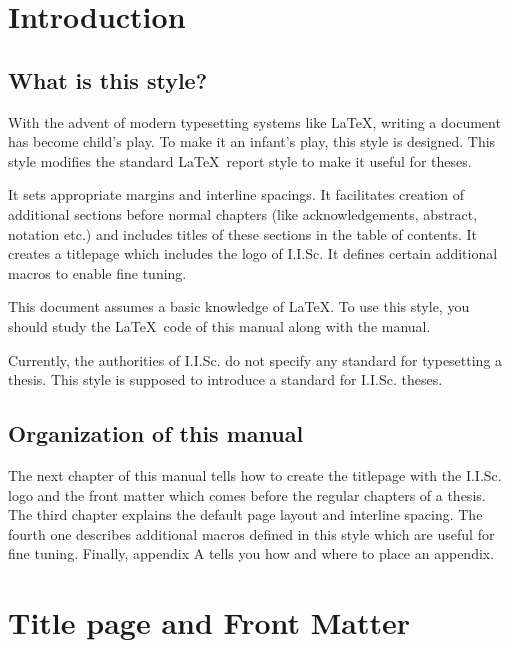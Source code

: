 \chapter{Introduction}

\section{What is this style?}
	With the  advent of modern typesetting  systems   like \LaTeX \cite{latex},
writing a document has  become child's  play.  To make it  an infant's
play,   this  style  is  designed.  This  style  modifies the standard
\LaTeX\ report style to make it useful for theses.

    It sets appropriate margins and interline spacings.  It facilitates
creation  of    additional  sections    before  normal  chapters  (like
acknowledgements, abstract, notation   etc.)   and includes titles  of
these sections in the table of contents. It  creates a titlepage which
includes  the  logo of  I.I.Sc.  It  defines certain  additional macros to enable
fine tuning.

	This  document assumes a basic knowledge  of  \LaTeX \cite{latex}. To use
this style, you should study the \LaTeX\ code of this manual  along with
the manual.

	Currently, the  authorities of   I.I.Sc.  do not   specify any
standard for typesetting a  thesis.  This  style is  supposed to introduce
a standard for I.I.Sc. theses. 

\section{Organization of this manual}
	  The  next chapter of  this manual tells how to  create the
titlepage with  the I.I.Sc. logo and the  front matter
which comes before the regular chapters of  a thesis. The  third
chapter explains the default page layout and interline spacing.
The fourth one describes additional macros defined in this style which
are useful for  fine tuning. Finally, appendix A tells you how and where
to place an appendix. 


\chapter{Title page and Front Matter}
